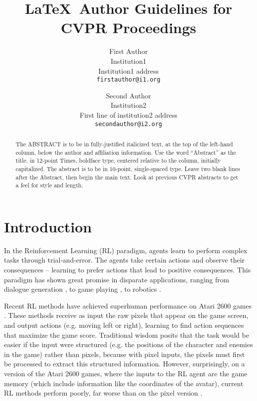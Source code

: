 \documentclass[10pt,twocolumn,letterpaper]{article}
\begin{document}
\title{\LaTeX\ Author Guidelines for CVPR Proceedings}

\author{First Author\\
Institution1\\
Institution1 address\\
{\tt\small firstauthor@i1.org}
\and
Second Author\\
Institution2\\
First line of institution2 address\\
{\tt\small secondauthor@i2.org}
}

\maketitle

\begin{abstract}
   The ABSTRACT is to be in fully-justified italicized text, at the top
   of the left-hand column, below the author and affiliation
   information. Use the word ``Abstract'' as the title, in 12-point
   Times, boldface type, centered relative to the column, initially
   capitalized. The abstract is to be in 10-point, single-spaced type.
   Leave two blank lines after the Abstract, then begin the main text.
   Look at previous CVPR abstracts to get a feel for style and length.
\end{abstract}

\section{Introduction}

In the Reinforcement Learning (RL) paradigm, agents learn to perform complex
tasks through trial-and-error. The agents take certain actions and observe their
consequences -- learning to prefer actions that lead to positive consequences.
This paradigm has shown great promise in disparate applications, ranging from
dialogue generation \citep{dialogue2016}, to game playing \citep{mnih2015human},
to robotics \citep{robotics2016}.

Recent RL methods have achieved superhuman performance on Atari 2600 games
\citep{bellemare2013arcade}. These methods receive as input the raw pixels that
appear on the game screen, and output actions (e.g. moving left or right),
learning to find action sequences that maximize the game score. Traditional
wisdom posits that the task would be easier if the input were structured (e.g.
the positions of the character and enemies in the game) rather than pixels,
because with pixel inputs, the pixels must first be processed to extract this
structured information. However, surprisingly, on a version of the Atari 2600
games, where the inputs to the RL agent are the game memory (which include
information like the coordinates of the avatar), current RL methods perform
poorly, far worse than on the pixel version \citep{atariRAM}.
\end{document}

